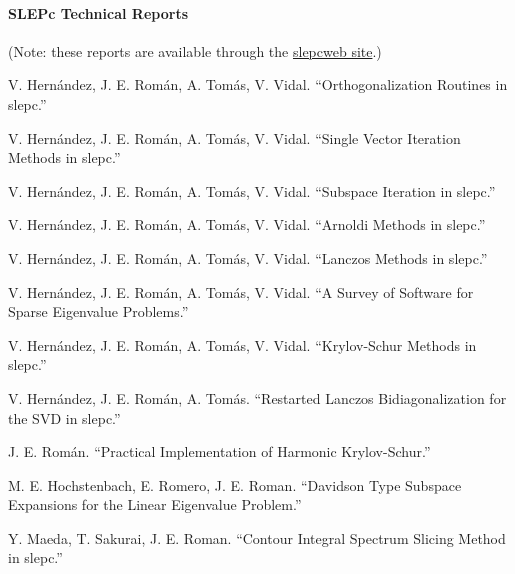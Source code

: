 \documentclass[titlepage,10pt,a4paper]{book}
\newcommand{\packnoi}[1]{{\sc #1}\xspace}
\newcommand{\slepc}{\texorpdfstring{\packnoi{slep\rm c}}{{SLEPc}}}
\begin{document}
{\bibfont
\paragraph{SLEPc Technical Reports}
\hypertarget{str}{}
(Note: these reports are available through the \href{https://slepc.upv.es}{\slepc web site}.)
\begin{list}{}{\setlength{\labelwidth}{3cm}\setlength{\leftmargin}{12.5mm}}
\item[\textrm{\sffamily[STR-1]}] V. Hern\'andez, J. E. Rom\'an, A. Tom\'as, V. Vidal. ``Orthogonalization Routines in \slepc.''
\item[\textrm{\sffamily[STR-2]}] V. Hern\'andez, J. E. Rom\'an, A. Tom\'as, V. Vidal. ``Single Vector Iteration Methods in \slepc.''
\item[\textrm{\sffamily[STR-3]}] V. Hern\'andez, J. E. Rom\'an, A. Tom\'as, V. Vidal. ``Subspace Iteration in \slepc.''
\item[\textrm{\sffamily[STR-4]}] V. Hern\'andez, J. E. Rom\'an, A. Tom\'as, V. Vidal. ``Arnoldi Methods in \slepc.''
\item[\textrm{\sffamily[STR-5]}] V. Hern\'andez, J. E. Rom\'an, A. Tom\'as, V. Vidal. ``Lanczos Methods in \slepc.''
\item[\textrm{\sffamily[STR-6]}] V. Hern\'andez, J. E. Rom\'an, A. Tom\'as, V. Vidal. ``A Survey of Software for Sparse Eigenvalue Problems.''
\item[\textrm{\sffamily[STR-7]}] V. Hern\'andez, J. E. Rom\'an, A. Tom\'as, V. Vidal. ``Krylov-Schur Methods in \slepc.''
\item[\textrm{\sffamily[STR-8]}] V. Hern\'andez, J. E. Rom\'an, A. Tom\'as. ``Restarted Lanczos Bidiagonalization for the SVD in \slepc.''
\item[\textrm{\sffamily[STR-9]}] J. E. Rom\'an. ``Practical Implementation of Harmonic Krylov-Schur.''
\item[\textrm{\sffamily[STR-10]}] M. E. Hochstenbach, E. Romero, J. E. Roman. ``Davidson Type Subspace Expansions for the Linear Eigenvalue Problem.''
\item[\textrm{\sffamily[STR-11]}] Y. Maeda, T. Sakurai, J. E. Roman. ``Contour Integral Spectrum Slicing Method in \slepc.''
\end{list}
}

\cleardoublepage
\fancyhead{}
\printindex
\cleardoublepage
\end{document}
